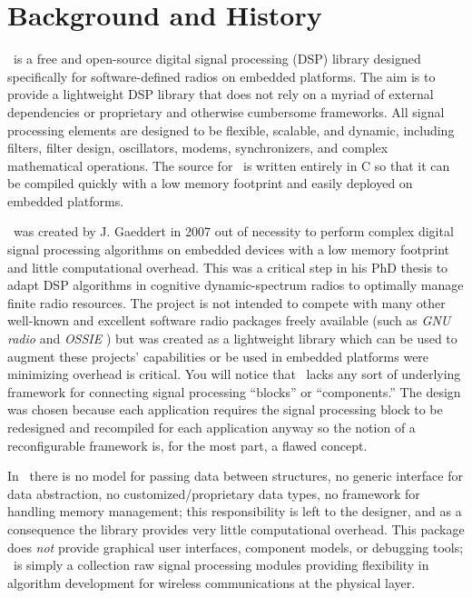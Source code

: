 %
%

\newpage
\section{Background and History}

\liquid\ is a free and open-source digital signal processing (DSP) library
designed specifically for software-defined radios on embedded platforms.
The aim is to provide a lightweight DSP library that does not rely on a myriad
of external dependencies or proprietary and otherwise cumbersome frameworks.
%
All signal processing elements are designed to be flexible, scalable, and
dynamic, including filters, filter design, oscillators, modems, synchronizers,
and complex mathematical operations.
The source for \liquid\ is written entirely in C so that it can be
compiled quickly with a low memory footprint
and easily deployed on embedded platforms.

\liquid\ was created by J. Gaeddert in 2007 out of necessity to perform
complex digital signal processing algorithms on embedded devices
with a low memory footprint and little computational overhead.
This was a critical step in his PhD thesis to adapt DSP algorithms in
cognitive dynamic-spectrum radios to optimally manage finite radio resources.
The project is not intended to compete with many other well-known and
excellent software radio packages freely available
(such as {\em GNU radio} \cite{gnuradio:web} and {\em OSSIE}
\cite{ossie:web})
but was created as a lightweight library which can be used to augment
these projects' capabilities
or be used in embedded platforms were minimizing overhead is critical.
You will notice that \liquid\ lacks any sort of underlying framework
for connecting signal processing ``blocks'' or ``components.''
The design was chosen because each application requires the signal
processing block to be redesigned and recompiled for each application
anyway so the notion of a reconfigurable framework is, for the most
part, a flawed concept.

In \liquid\ there is
no model for passing data between structures,
no generic interface for data abstraction,
no customized/proprietary data types,
no framework for handling memory management;
this responsibility is left to the designer,
and as a consequence the library provides very little computational overhead.
This package does {\em not} provide
graphical user interfaces,
component models, or
debugging tools;
\liquid\ is simply a collection raw signal processing modules
providing flexibility in algorithm development for wireless
communications at the physical layer.


